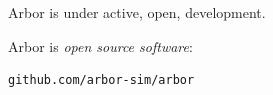 \documentclass[aspectratio=43]{beamer}
\newcommand{\arbor}{{\ttfamily Arbor}\xspace}
\begin{document}
\begin{frame}[fragile]{}
    \arbor is under active, open, development.

    \vspace{10pt}

    \begin{center}
        \arbor is \emph{open source software}:\\
        \vspace{3pt}
        \begin{lstlisting}[style=talkpseudo]
                  github.com/arbor-sim/arbor
        \end{lstlisting}
    \end{center}
\end{frame}
\end{document}
